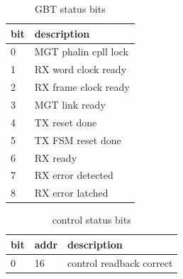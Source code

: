 \documentclass{article}
\begin{document}
\begin{table}[H]
\centering
\begin{tabular}{| l | l |}
\hline
bit & description \\ \hline
0 & MGT phalin cpll lock \\ \hline
1 & RX word clock ready \\ \hline
2 & RX frame clock ready \\ \hline
3 & MGT link ready \\ \hline
4 & TX reset done \\ \hline
5 & TX FSM reset done \\ \hline
6 & RX ready \\ \hline
7 & RX error detected \\ \hline
8 & RX error latched \\ \hline
\end{tabular}
\caption{GBT status bits\label{tab14}}
\end{table}


\begin{table}[H]
\centering
\begin{tabular}{| l | l | l |}
\hline
bit & addr & description \\ \hline
0 & 16 & control readback correct \\ \hline

\end{tabular}
\caption{control status bits\label{tab14}}
\end{table}
\end{document}

